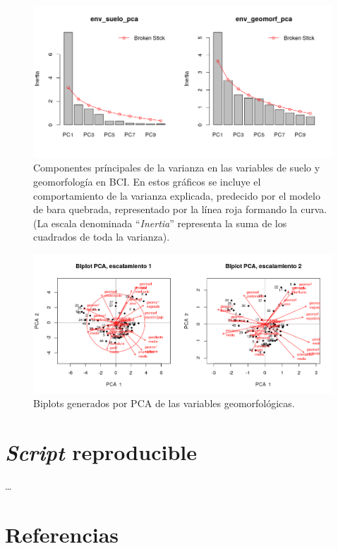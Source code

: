 \documentclass[11pt,]{article}
\begin{document}
\begin{figure}
\centering
\includegraphics{env_suelo_geomorf_pca_br_stick.png}
\caption{Componentes príncipales de la varianza en las variables de
suelo y geomorfología en BCI. En estos gráficos se incluye el
comportamiento de la varianza explicada, predecido por el modelo de bara
quebrada, representado por la línea roja formando la curva. (La escala
denominada ``\emph{Inertia}'' representa la suma de los cuadrados de
toda la varianza). \label{fig:pca_suelo_geomorf_br_stick}}
\end{figure}

\begin{figure}
\centering
\includegraphics{pca_biplot_geomorf.png}
\caption{Biplots generados por PCA de las variables geomorfológicas.
\label{fig:pca_biplot_geomorf}}
\end{figure}

\section{\texorpdfstring{\emph{Script}
reproducible}{Script reproducible}}\label{script-reproducible}

\ldots

\section*{Referencias}\label{referencias}
\end{document}
